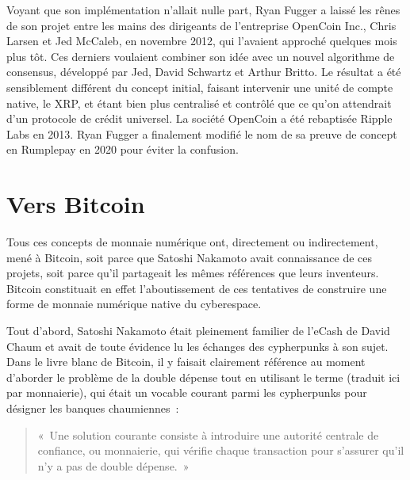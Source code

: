 Voyant que son implémentation n'allait nulle part, Ryan Fugger a laissé les rênes de son projet entre les mains des dirigeants de l'entreprise OpenCoin Inc., Chris Larsen et Jed McCaleb, en novembre 2012, qui l'avaient approché quelques mois plus tôt. Ces derniers voulaient combiner son idée avec un nouvel algorithme de consensus, développé par Jed, David Schwartz et Arthur Britto. Le résultat a été sensiblement différent du concept initial, faisant intervenir une unité de compte native, le XRP, et étant bien plus centralisé et contrôlé que ce qu'on attendrait d'un protocole de crédit universel. La société OpenCoin a été rebaptisée Ripple Labs en 2013. Ryan Fugger a finalement modifié le nom de sa preuve de concept en Rumplepay en 2020 pour éviter la confusion.

\section*{Vers Bitcoin}

Tous ces concepts de monnaie numérique ont, directement ou indirectement, mené à Bitcoin, soit parce que Satoshi Nakamoto avait connaissance de ces projets, soit parce qu'il partageait les mêmes références que leurs inventeurs. Bitcoin constituait en effet l'aboutissement de ces tentatives de construire une forme de monnaie numérique native du cyberespace.

Tout d'abord, Satoshi Nakamoto était pleinement familier de l'eCash de David Chaum et avait de toute évidence lu les échanges des cypherpunks à son sujet. Dans le livre blanc de Bitcoin, il y faisait clairement référence au moment d'aborder le problème de la double dépense tout en utilisant le terme  (traduit ici par monnaierie), qui était un vocable courant parmi les cypherpunks pour désigner les banques chaumiennes~:

\begin{quote}
«~Une solution courante consiste à introduire une autorité centrale de confiance, ou monnaierie, qui vérifie chaque transaction pour s'assurer qu'il n'y a pas de double dépense.~»
\end{quote}


